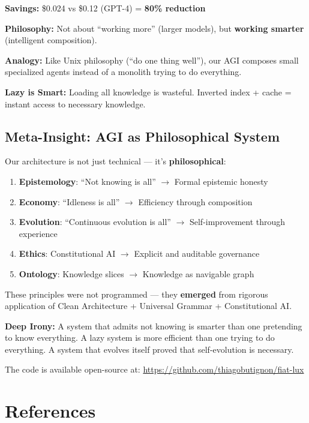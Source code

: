 \documentclass[11pt]{article}
\begin{document}
\textbf{Savings:} \$0.024 vs \$0.12 (GPT-4) = \textbf{80\% reduction}

\textbf{Philosophy:} Not about ``working more'' (larger models), but \textbf{working smarter} (intelligent composition).

\textbf{Analogy:} Like Unix philosophy (``do one thing well''), our AGI composes small specialized agents instead of a monolith trying to do everything.

\textbf{Lazy is Smart:} Loading all knowledge is wasteful. Inverted index + cache = instant access to necessary knowledge.

\subsection{Meta-Insight: AGI as Philosophical System}

Our architecture is not just technical --- it's \textbf{philosophical}:

\begin{enumerate}
    \item \textbf{Epistemology}: ``Not knowing is all'' $\rightarrow$ Formal epistemic honesty
    \item \textbf{Economy}: ``Idleness is all'' $\rightarrow$ Efficiency through composition
    \item \textbf{Evolution}: ``Continuous evolution is all'' $\rightarrow$ Self-improvement through experience
    \item \textbf{Ethics}: Constitutional AI $\rightarrow$ Explicit and auditable governance
    \item \textbf{Ontology}: Knowledge slices $\rightarrow$ Knowledge as navigable graph
\end{enumerate}

These principles were not programmed --- they \textbf{emerged} from rigorous application of Clean Architecture + Universal Grammar + Constitutional AI.

\textbf{Deep Irony:} A system that admits not knowing is smarter than one pretending to know everything. A lazy system is more efficient than one trying to do everything. A system that evolves itself proved that self-evolution is necessary.

The code is available open-source at:
\url{https://github.com/thiagobutignon/fiat-lux}

\section*{References}
\end{document}
